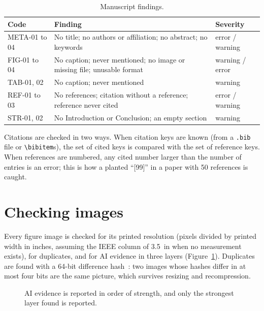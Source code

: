 \documentclass[11pt,a4paper,oneside,openany]{book}
\newcommand{\code}[1]{\texttt{#1}}
\begin{document}
\begin{table}[htbp]
\centering\small
\caption{Manuscript findings.}
\label{tab:codes}
\begin{tabularx}{\linewidth}{l X l}
\toprule
Code & Finding & Severity\\
\midrule
META-01 to 04 & No title; no authors or affiliation; no abstract; no keywords & error / warning\\
FIG-01 to 04 & No caption; never mentioned; no image or missing file; unusable format & warning / error\\
TAB-01, 02 & No caption; never mentioned & warning\\
REF-01 to 03 & No references; citation without a reference; reference never cited & error / warning\\
STR-01, 02 & No Introduction or Conclusion; an empty section & warning\\
\bottomrule
\end{tabularx}
\end{table}

Citations are checked in two ways. When citation keys are known (from a \code{.bib} file or
\code{\textbackslash bibitem}s), the set of cited keys is compared with the set of reference keys. When
references are numbered, any cited number larger than the number of entries is an error; this is how a
planted ``[99]'' in a paper with 50 references is caught.

\section{Checking images}
Every figure image is checked for its printed resolution (pixels divided by printed width in inches,
assuming the IEEE column of 3.5~in when no measurement exists), for duplicates, and for AI evidence in
three layers (Figure~\ref{fig:layers}). Duplicates are found with a 64-bit difference hash~\cite{dhash}:
two images whose hashes differ in at most four bits are the same picture, which survives resizing and
recompression.

\begin{figure}[htbp]
\centering
{}
\caption{AI evidence is reported in order of strength, and only the strongest layer found is reported.}
\label{fig:layers}
\end{figure}
\end{document}
